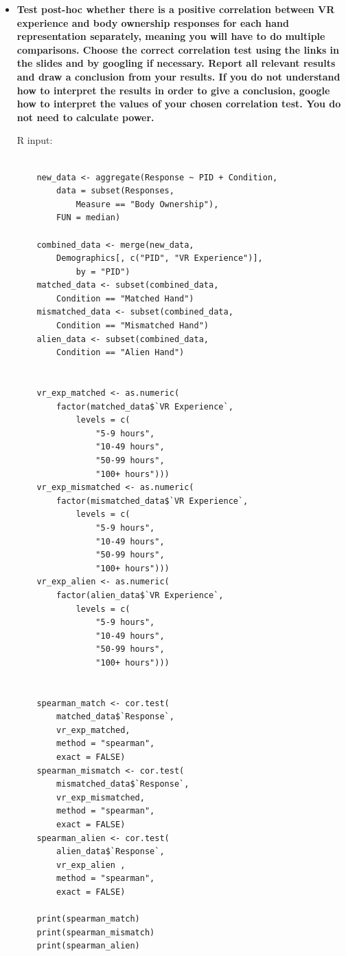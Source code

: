 \begin{itemize}
\item {
    \textbf{
        Test post-hoc whether there is a positive correlation between VR
        experience and body ownership responses for each hand representation separately, meaning you will have to do multiple comparisons. Choose the correct correlation test using the links in the
        slides and by googling if necessary. Report all relevant results and
        draw a conclusion from your results. If you do not understand
        how to interpret the results in order to give a conclusion, google
        how to interpret the values of your chosen correlation test. You do
        not need to calculate power.
    }

	R input:
    \begin{verbatim}
		
	new_data <- aggregate(Response ~ PID + Condition,
        data = subset(Responses,
            Measure == "Body Ownership"),
        FUN = median)

	combined_data <- merge(new_data,
        Demographics[, c("PID", "VR Experience")],
            by = "PID")
	matched_data <- subset(combined_data,
        Condition == "Matched Hand")
	mismatched_data <- subset(combined_data,
        Condition == "Mismatched Hand")
	alien_data <- subset(combined_data,
        Condition == "Alien Hand")


	vr_exp_matched <- as.numeric(
        factor(matched_data$`VR Experience`,
            levels = c(
                "5-9 hours",
                "10-49 hours",
                "50-99 hours",
                "100+ hours")))
	vr_exp_mismatched <- as.numeric(
        factor(mismatched_data$`VR Experience`,
            levels = c(
                "5-9 hours",
                "10-49 hours",
                "50-99 hours",
                "100+ hours")))
	vr_exp_alien <- as.numeric(
        factor(alien_data$`VR Experience`,
            levels = c(
                "5-9 hours",
                "10-49 hours",
                "50-99 hours",
                "100+ hours")))


	spearman_match <- cor.test(
        matched_data$`Response`,
        vr_exp_matched,
        method = "spearman",
        exact = FALSE)
	spearman_mismatch <- cor.test(
        mismatched_data$`Response`,
        vr_exp_mismatched,
        method = "spearman",
        exact = FALSE)
	spearman_alien <- cor.test(
        alien_data$`Response`,
        vr_exp_alien ,
        method = "spearman",
        exact = FALSE)

	print(spearman_match)
	print(spearman_mismatch)
	print(spearman_alien)


\end{verbatim}}
\end{itemize}
